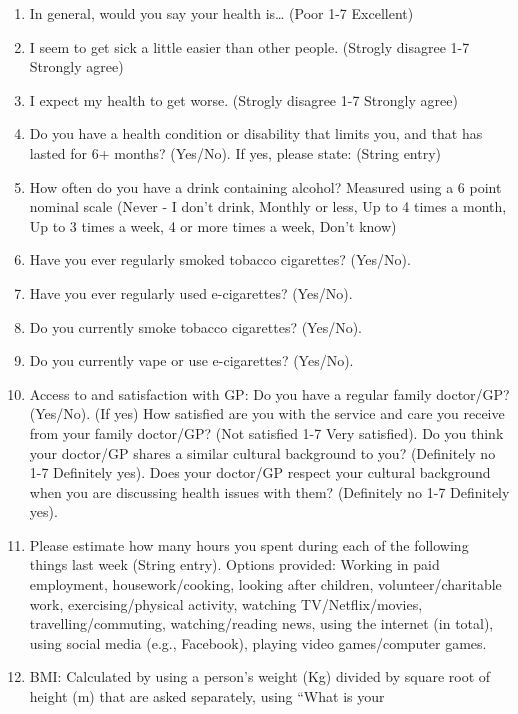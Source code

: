 \documentclass[
  man,
  longtable,
  nolmodern,
  notxfonts,
  notimes,
  colorlinks=true,linkcolor=blue,citecolor=blue,urlcolor=blue]{apa7}
\begin{document}
\begin{itemize}
  \begin{enumerate}
  \def\labelenumi{\arabic{enumi}.}
  \item
    In general, would you say your health is\ldots{} (Poor 1-7
    Excellent)
  \item
    I seem to get sick a little easier than other people. (Strogly
    disagree 1-7 Strongly agree)
  \item
    I expect my health to get worse. (Strogly disagree 1-7 Strongly
    agree)
  \item
    Do you have a health condition or disability that limits you, and
    that has lasted for 6+ months? (Yes/No). If yes, please state:
    (String entry)
  \item
    How often do you have a drink containing alcohol? Measured using a 6
    point nominal scale (Never - I don't drink, Monthly or less, Up to 4
    times a month, Up to 3 times a week, 4 or more times a week, Don't
    know)
  \item
    Have you ever regularly smoked tobacco cigarettes? (Yes/No).
  \item
    Have you ever regularly used e-cigarettes? (Yes/No).
  \item
    Do you currently smoke tobacco cigarettes? (Yes/No).
  \item
    Do you currently vape or use e-cigarettes? (Yes/No).
  \item
    Access to and satisfaction with GP: Do you have a regular family
    doctor/GP? (Yes/No). (If yes) How satisfied are you with the service
    and care you receive from your family doctor/GP? (Not satisfied 1-7
    Very satisfied). Do you think your doctor/GP shares a similar
    cultural background to you? (Definitely no 1-7 Definitely yes). Does
    your doctor/GP respect your cultural background when you are
    discussing health issues with them? (Definitely no 1-7 Definitely
    yes).
  \item
    Please estimate how many hours you spent during each of the
    following things last week (String entry). Options provided: Working
    in paid employment, housework/cooking, looking after children,
    volunteer/charitable work, exercising/physical activity, watching
    TV/Netflix/movies, travelling/commuting, watching/reading news,
    using the internet (in total), using social media (e.g., Facebook),
    playing video games/computer games.
  \item
    BMI: Calculated by using a person's weight (Kg) divided by square
    root of height (m) that are asked separately, using ``What is your

\end{enumerate}
\end{itemize}
\end{document}
